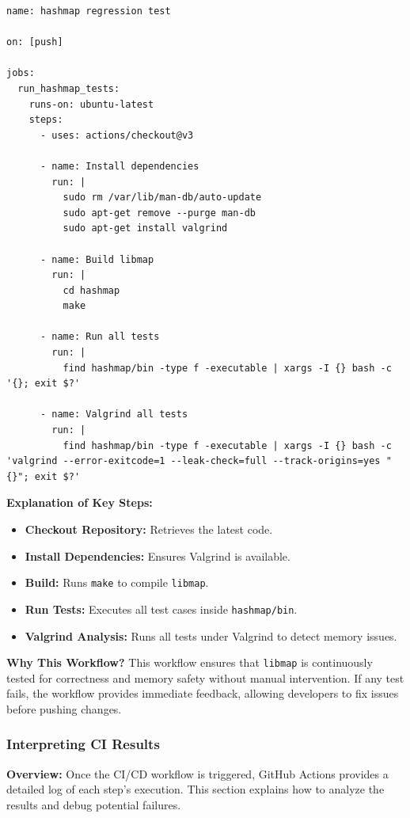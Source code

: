 \documentclass[titlepage]{article}
\begin{document}
\begin{verbatim}
name: hashmap regression test

on: [push]

jobs:
  run_hashmap_tests:
    runs-on: ubuntu-latest
    steps:
      - uses: actions/checkout@v3

      - name: Install dependencies
        run: |
          sudo rm /var/lib/man-db/auto-update
          sudo apt-get remove --purge man-db
          sudo apt-get install valgrind

      - name: Build libmap
        run: |
          cd hashmap
          make

      - name: Run all tests
        run: |
          find hashmap/bin -type f -executable | xargs -I {} bash -c '{}; exit $?'

      - name: Valgrind all tests
        run: |
          find hashmap/bin -type f -executable | xargs -I {} bash -c 'valgrind --error-exitcode=1 --leak-check=full --track-origins=yes "{}"; exit $?'
\end{verbatim}

\textbf{Explanation of Key Steps:}  
\begin{itemize}
    \item \textbf{Checkout Repository:} Retrieves the latest code.
    \item \textbf{Install Dependencies:} Ensures Valgrind is available.
    \item \textbf{Build:} Runs \texttt{make} to compile \texttt{libmap}.
    \item \textbf{Run Tests:} Executes all test cases inside \texttt{hashmap/bin}.
    \item \textbf{Valgrind Analysis:} Runs all tests under Valgrind to detect memory issues.
\end{itemize}

\textbf{Why This Workflow?}  
This workflow ensures that \texttt{libmap} is continuously tested for correctness and memory safety without manual intervention. If any test fails, the workflow provides immediate feedback, allowing developers to fix issues before pushing changes.  



\subsubsection{Interpreting CI Results}

\textbf{Overview:}  
Once the CI/CD workflow is triggered, GitHub Actions provides a detailed log of each step's execution. This section explains how to analyze the results and debug potential failures.
\end{document}
